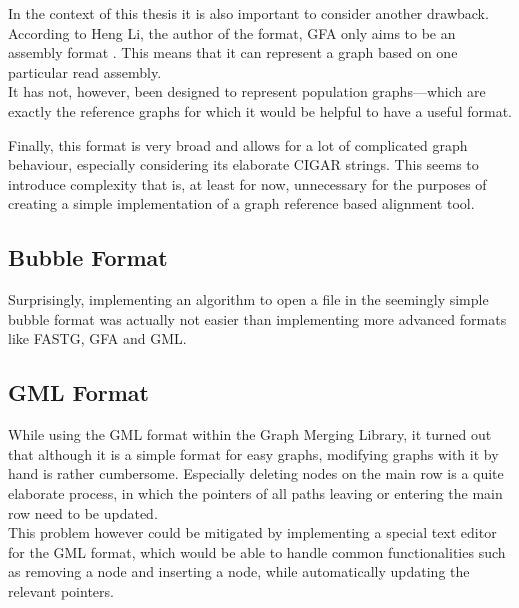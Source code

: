 \documentclass[a4paper,12pt,twoside,BCOR=10mm]{scrbook}
\begin{document}
In the context of this thesis it is also important to consider another drawback. 
According to Heng Li, the author of the format, GFA only aims to be an assembly format \citep{specGFA3}.
This means that it can represent a graph based on one particular read assembly. \\
It has not, however, been designed to represent population graphs---which are exactly 
the reference graphs for which it would be helpful to have a useful format.

Finally, this format is very broad and allows for a lot of complicated 
graph behaviour, especially considering its elaborate CIGAR strings. 
This seems to introduce complexity that is, at least for now, 
unnecessary for the purposes of creating a simple 
implementation of a graph reference based alignment tool.


\subsection{Bubble Format}

Surprisingly, implementing an algorithm to open a file in the seemingly simple bubble format was actually 
not easier than implementing more advanced formats like FASTG, GFA and GML.


\subsection{GML Format}

While using the GML format within the Graph Merging Library, 
it turned out that although it is a simple format for easy graphs, 
modifying graphs with it by hand is rather cumbersome. 
Especially deleting nodes on the main row is a quite elaborate process, 
in which the pointers of all paths leaving or entering the main row 
need to be updated. \\
This problem however could be mitigated by implementing a special text editor 
for the GML format, which would be able to handle common functionalities such as 
removing a node and inserting a node, while automatically updating the relevant pointers.
\end{document}
